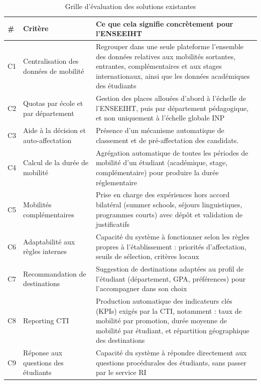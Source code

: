 \renewcommand{\arraystretch}{1.45}
\begin{table}[H]
\centering
\caption{Grille d'évaluation des solutions existantes}
\label{tab:grille_eval}
\footnotesize
\begin{tabular}{|p{0.6cm}|p{3.8cm}|p{9.2cm}|}
\hline
\rowcolor{gray!20}
\textbf{\#} & \textbf{Critère} & \textbf{Ce que cela signifie concrètement pour l'ENSEEIHT} \\
\hline
C1 & Centralisation des données de mobilité & Regrouper dans une seule plateforme
l'ensemble des données relatives aux mobilités sortantes, entrantes, complémentaires
et aux stages internationaux, ainsi que les données académiques des étudiants \\
\hline
C2 & Quotas par école et par département & Gestion des places allouées d'abord à l'échelle de l'ENSEEIHT, puis par département pédagogique, et non uniquement à l'échelle globale INP \\
\hline
C3 & Aide à la décision et auto-affectation & Présence d'un mécanisme automatique de classement et de pré-affectation des candidats. \\
\hline
C4 & Calcul de la durée de mobilité & Agrégation automatique de toutes les périodes de mobilité d'un étudiant (académique, stage, complémentaire) pour produire la durée réglementaire \\
\hline
C5 & Mobilités complémentaires & Prise en charge des expériences hors accord bilatéral (summer schools, séjours linguistiques, programmes courts) avec dépôt et validation de justificatifs \\
\hline
C6 & Adaptabilité aux règles internes & Capacité du système à fonctionner selon les règles propres à l'établissement : priorités d'affectation, seuils de sélection, critères locaux \\
\hline
C7 & Recommandation de destinations & Suggestion de destinations adaptées au profil de l'étudiant (département, GPA, préférences) pour l'accompagner dans son choix \\
\hline
C8 & Reporting CTI & Production automatique des indicateurs clés (KPIs) exigés par la CTI, notamment : taux de mobilité par promotion, durée moyenne de mobilité par étudiant, et répartition géographique des destinations \\
\hline
C9 & Réponse aux questions des étudiants & Capacité du système à répondre directement aux questions procédurales des étudiants, sans passer par le service RI \\
\hline
\end{tabular}
\end{table}

